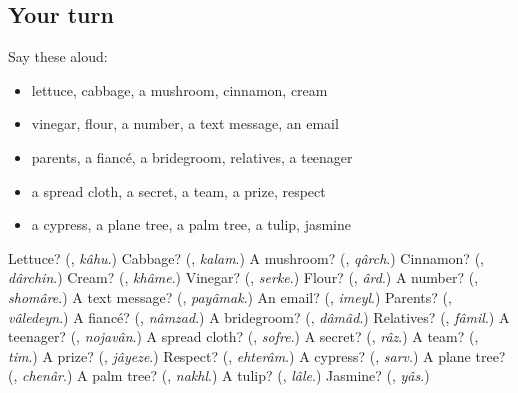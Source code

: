 \subsection*{Your turn}
Say these aloud:

\begin{itemize}
\raggedright
  \item lettuce, cabbage, a mushroom, cinnamon, cream
  \item vinegar, flour, a number, a text message, an email
  \item parents, a fiancé, a bridegroom, relatives, a teenager
  \item a spread cloth, a secret, a team, a prize, respect
  \item a cypress, a plane tree, a palm tree, a tulip, jasmine
\end{itemize}

\begin{tcolorbox}[breakable,colback=teal!4,colframe=teal!35!black,title={Before you move on}]
Lettuce? (\textbf{}, \emph{kâhu}.) Cabbage? (\textbf{}, \emph{kalam}.) A mushroom? (\textbf{}, \emph{qârch}.) Cinnamon? (\textbf{}, \emph{dârchin}.) Cream? (\textbf{}, \emph{khâme}.) Vinegar? (\textbf{}, \emph{serke}.) Flour? (\textbf{}, \emph{ârd}.) A number? (\textbf{}, \emph{shomâre}.) A text message? (\textbf{}, \emph{payâmak}.) An email? (\textbf{}, \emph{imeyl}.) Parents? (\textbf{}, \emph{vâledeyn}.) A fiancé? (\textbf{}, \emph{nâmzad}.) A bridegroom? (\textbf{}, \emph{dâmâd}.) Relatives? (\textbf{}, \emph{fâmil}.) A teenager? (\textbf{}, \emph{nojavân}.) A spread cloth? (\textbf{}, \emph{sofre}.) A secret? (\textbf{}, \emph{râz}.) A team? (\textbf{}, \emph{tim}.) A prize? (\textbf{}, \emph{jâyeze}.) Respect? (\textbf{}, \emph{ehterâm}.) A cypress? (\textbf{}, \emph{sarv}.) A plane tree? (\textbf{}, \emph{chenâr}.) A palm tree? (\textbf{}, \emph{nakhl}.) A tulip? (\textbf{}, \emph{lâle}.) Jasmine? (\textbf{}, \emph{yâs}.)
\end{tcolorbox}
